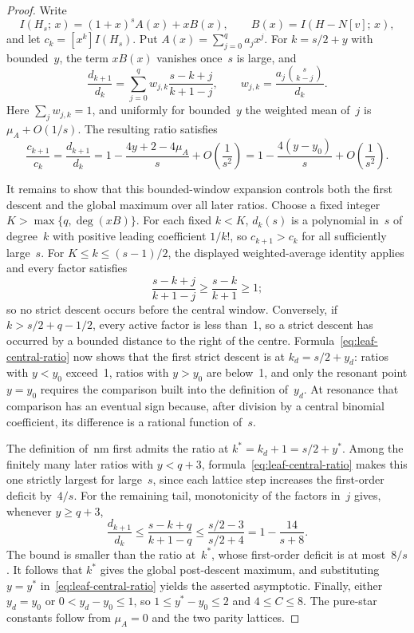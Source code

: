 \documentclass[12pt,oneside]{article}
\theoremstyle{remark}
\newcommand{\nm}{\mathrm{nm}}             %
\begin{document}
\begin{proof}
Write
\[
  I(H_s;\,x)=(1+x)^sA(x)+xB(x),
  \qquad B(x)=I(H-N[v];\,x),
\]
and let $c_k=[x^k]I(H_s)$.
Put $A(x)=\sum_{j=0}^q a_jx^j$.
For $k=s/2+y$ with bounded~$y$, the term $xB(x)$ vanishes once~$s$ is large, and
\[
  \frac{d_{k+1}}{d_k}
  =\sum_{j=0}^q w_{j,k}\frac{s-k+j}{k+1-j},
  \qquad
  w_{j,k}=\frac{a_j\binom{s}{k-j}}{d_k}.
\]
Here $\sum_jw_{j,k}=1$, and uniformly for bounded~$y$ the weighted mean of~$j$ is $\mu_A+O(1/s)$.
The resulting ratio satisfies
\begin{equation}\label{eq:leaf-central-ratio}
  \frac{c_{k+1}}{c_k}=\frac{d_{k+1}}{d_k}
  =1-\frac{4y+2-4\mu_A}{s}+O\!\left(\frac1{s^2}\right)
  =1-\frac{4(y-y_0)}s+O\!\left(\frac1{s^2}\right).
\end{equation}

It remains to show that this bounded-window expansion controls both the first descent and the global maximum over all later ratios.
Choose a fixed integer $K>\max\{q,\deg(xB)\}$.
For each fixed $k<K$, $d_k(s)$ is a polynomial in~$s$ of degree~$k$ with positive leading coefficient $1/k!$, so $c_{k+1}>c_k$ for all sufficiently large~$s$.
For $K\le k\le(s-1)/2$, the displayed weighted-average identity applies and every factor satisfies
\[
  \frac{s-k+j}{k+1-j}\ge\frac{s-k}{k+1}\ge1;
\]
so no strict descent occurs before the central window.
Conversely, if $k>s/2+q-1/2$, every active factor is less than~1, so a strict descent has occurred by a bounded distance to the right of the centre.
Formula~\eqref{eq:leaf-central-ratio} now shows that the first strict descent is at $k_d=s/2+y_d$: ratios with $y<y_0$ exceed~1, ratios with $y>y_0$ are below~1, and only the resonant point $y=y_0$ requires the comparison built into the definition of~$y_d$.
At resonance that comparison has an eventual sign because, after division by a central binomial coefficient, its difference is a rational function of~$s$.

The definition of~$\nm$ first admits the ratio at $k^*=k_d+1=s/2+y^*$.
Among the finitely many later ratios with $y<q+3$, formula~\eqref{eq:leaf-central-ratio} makes this one strictly largest for large~$s$, since each lattice step increases the first-order deficit by~$4/s$.
For the remaining tail, monotonicity of the factors in~$j$ gives, whenever $y\ge q+3$,
\[
  \frac{d_{k+1}}{d_k}
  \le\frac{s-k+q}{k+1-q}
  \le\frac{s/2-3}{s/2+4}
  =1-\frac{14}{s+8}.
\]
The bound is smaller than the ratio at~$k^*$, whose first-order deficit is at most~$8/s$.
It follows that $k^*$ gives the global post-descent maximum, and substituting $y=y^*$ in~\eqref{eq:leaf-central-ratio} yields the asserted asymptotic.
Finally, either $y_d=y_0$ or $0<y_d-y_0\le1$, so $1\le y^*-y_0\le2$ and $4\le C\le8$.
The pure-star constants follow from $\mu_A=0$ and the two parity lattices.
\end{proof}
\end{document}
